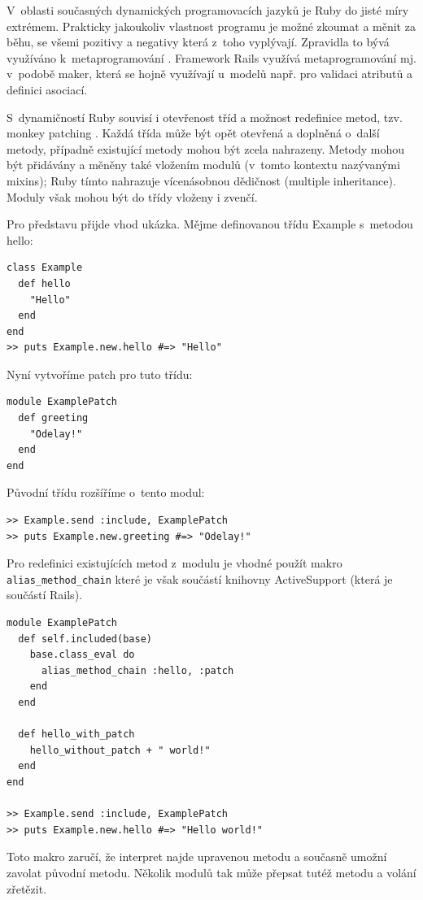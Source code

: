 \documentclass[thesis=B,czech]{FITthesis}[2012/05/02]
\begin{document}
V~oblasti současných dynamických programovacích jazyků je Ruby do jisté
míry extrémem. Prakticky jakoukoliv vlastnost programu je možné zkoumat
a měnit za běhu, se všemi pozitivy a negativy která z~toho vyplývají.
Zpravidla to bývá využíváno k~metaprogramování \citep[3c]{why2008}.
Framework Rails využívá metaprogramování mj. v~podobě maker, která se
hojně využívají u~modelů např. pro validaci atributů a definici
asociací.

S~dynamičností Ruby souvisí i otevřenost tříd a možnost redefinice
metod, tzv. monkey patching \citep[str. 293]{Olsen2011}. Každá třída
může být opět otevřená a doplněná o~další metody, případně existující
metody mohou být zcela nahrazeny. Metody mohou být přidávány a měněny
také vložením modulů (v~tomto kontextu nazývanými mixins); Ruby tímto
nahrazuje vícenásobnou dědičnost (multiple inheritance). Moduly však
mohou být do třídy vloženy i zvenčí.

Pro představu přijde vhod ukázka. Mějme definovanou třídu Example
s~metodou hello:

\begin{lstlisting}
class Example
  def hello
    "Hello"
  end
end
>> puts Example.new.hello #=> "Hello"
\end{lstlisting}
Nyní vytvoříme patch pro tuto třídu:

\begin{lstlisting}
module ExamplePatch
  def greeting
    "Odelay!"
  end
end
\end{lstlisting}
Původní třídu rozšíříme o~tento modul:

\begin{lstlisting}
>> Example.send :include, ExamplePatch
>> puts Example.new.greeting #=> "Odelay!"
\end{lstlisting}
Pro redefinici existujících metod z~modulu je vhodné použít makro
\lstinline!alias_method_chain! které je však součástí knihovny
ActiveSupport (která je součástí Rails).

\begin{lstlisting}
module ExamplePatch
  def self.included(base)
    base.class_eval do
      alias_method_chain :hello, :patch
    end
  end

  def hello_with_patch
    hello_without_patch + " world!"
  end
end

>> Example.send :include, ExamplePatch
>> puts Example.new.hello #=> "Hello world!"
\end{lstlisting}
Toto makro zaručí, že interpret najde upravenou metodu a současně umožní
zavolat původní metodu. Několik modulů tak může přepsat tutéž metodu a
volání zřetězit.
\end{document}

